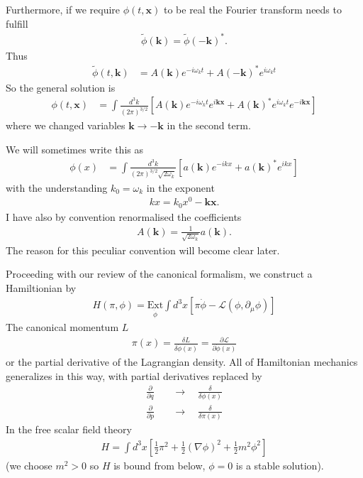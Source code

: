 \documentclass{article}
\begin{document}
Furthermore, if we require $\phi(t,\mathbf{x})$ to be real the Fourier transform needs to fulfill
\begin{align}
\tilde{\phi}(\mathbf{k})=\tilde{\phi}(-\mathbf{k})^*.
\end{align}
Thus
\begin{align}
\tilde{\phi}(t,\mathbf{k})
&=A(\mathbf{k})e^{-i\omega_k t}+A(-\mathbf{k})^*e^{i\omega_k t}
\end{align}
So the general solution is
\begin{align}
\phi(t,\mathbf{x})
&=\int\frac{d^3k}{(2\pi)^{3/2}}\left[A(\mathbf{k})e^{-i\omega_k t}e^{i\mathbf{k}\mathbf{x}}+A(\mathbf{k})^*e^{i\omega_k t}e^{-i\mathbf{k}\mathbf{x}}\right]
\end{align}
where we changed variables $\mathbf{k}\rightarrow-\mathbf{k}$ in the second term.

We will  sometimes write this as
\begin{align}
\phi(x)
&=\int\frac{d^3k}{(2\pi)^{3/2}\sqrt{2\omega_k}}\left[a(\mathbf{k})e^{-ikx}+a(\mathbf{k})^*e^{ikx}\right]
\end{align}
with the understanding $k_0=\omega_k$ in the exponent
\begin{align}
kx=k_0x^0-\mathbf{k}\mathbf{x}.
\end{align}
I have also by convention renormalised the coefficients
\begin{align}
A(\mathbf{k})=\frac{1}{\sqrt{2\omega_k}}a(\mathbf{k}).
\end{align}
The reason for this peculiar convention will become clear later.

Proceeding with our review of the canonical formalism, we construct a Hamiltionian by
\begin{align}
H(\pi,\phi)=\underset{\dot{\phi}}{\text{Ext}}\int d^3x\left[\pi\dot{\phi}-\mathcal{L}(\phi,\partial_\mu\phi)\right]
\end{align}
The canonical momentum $L$
\begin{align}
\pi(x)=\frac{\delta L}{\delta \dot{\phi}(x)}=\frac{\partial \mathcal{L}}{\partial \dot{\phi}(x)}
\end{align} 
or the partial derivative of the Lagrangian density.
All of Hamiltonian mechanics generalizes in this way, with partial derivatives replaced by
\begin{align}
\frac{\partial}{\partial q}\quad &\rightarrow\quad\frac{\delta}{\delta \phi(x)}\\
\frac{\partial}{\partial p}\quad &\rightarrow\quad\frac{\delta}{\delta \pi(x)}
\end{align}
In the free scalar field theory
\begin{align}
H=\int d^3x\left[\frac{1}{2}\pi^2+\frac{1}{2}(\nabla\phi)^2+\frac{1}{2}m^2\phi^2\right]
\end{align}
(we choose $m^2>0$ so $H$ is bound from below, $\phi=0$ is a stable solution).
\end{document}
